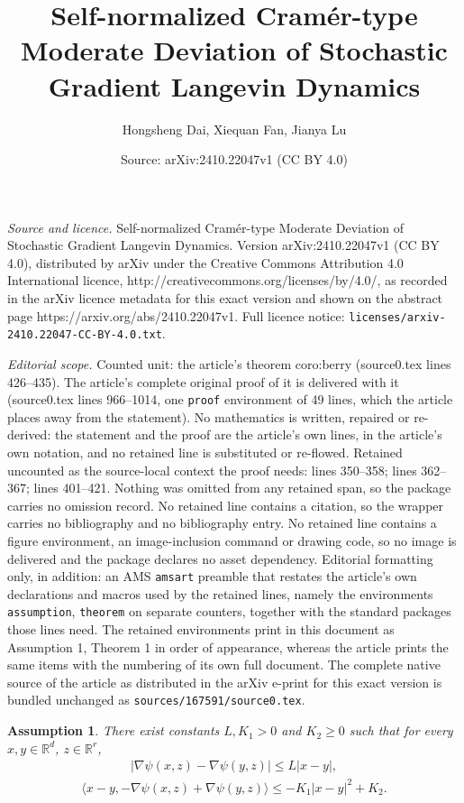 \documentclass[10pt,a4paper]{amsart}
\title{Self-normalized Cram\'er-type Moderate Deviation of Stochastic Gradient Langevin Dynamics}
\author{Hongsheng Dai, Xiequan Fan, Jianya Lu}
\date{Source: arXiv:2410.22047v1 (CC BY 4.0)}
\newtheorem{assumption}{Assumption}
\newcommand{\Ll}{\langle}
\newcommand{\R}{\mathbb{R}}\newcommand{\RR}{\mathbb{R}}
\newcommand{\Rr}{\rangle}
\begin{document}
\maketitle

\noindent\emph{Source and licence.} Self-normalized Cram\'er-type Moderate Deviation of Stochastic Gradient Langevin Dynamics. Version arXiv:2410.22047v1 (CC BY 4.0), distributed by arXiv under the Creative Commons Attribution 4.0 International licence, http://creativecommons.org/licenses/by/4.0/, as recorded in the arXiv licence metadata for this exact version and shown on the abstract page https://arxiv.org/abs/2410.22047v1. Full licence notice: \texttt{licenses/arxiv-2410.22047-CC-BY-4.0.txt}.\par\smallskip

\noindent\textit{Editorial scope.} Counted unit: the article's theorem coro:berry (source0.tex lines 426--435). The article's complete original proof of it is delivered with it (source0.tex lines 966--1014, one \texttt{proof} environment of 49 lines, which the article places away from the statement). No mathematics is written, repaired or re-derived: the statement and the proof are the article's own lines, in the article's own notation, and no retained line is substituted or re-flowed.  Retained uncounted as the source-local context the proof needs: lines 350--358; lines 362--367; lines 401--421.  Nothing was omitted from any retained span, so the package carries no omission record.  No retained line contains a citation, so the wrapper carries no bibliography and no bibliography entry.  No retained line contains a figure environment, an image-inclusion command or drawing code, so no image is delivered and the package declares no asset dependency.  Editorial formatting only, in addition: an AMS \texttt{amsart} preamble that restates the article's own declarations and macros used by the retained lines, namely the environments \texttt{assumption}, \texttt{theorem} on separate counters, together with the standard packages those lines need.  The retained environments print in this document as Assumption 1, Theorem 1 in order of appearance, whereas the article prints the same items with the numbering of its own full document.  The complete native source of the article as distributed in the arXiv e-print for this exact version is bundled unchanged as \texttt{sources/167591/source0.tex}.
\begin{assumption}\label{assu1}
	There exist constants $L, K_1 >0$ and $K_2 \ge 0$ such that for every $x,y\in \R^d$, $z\in\R^r$, 
	\begin{eqnarray}\label{e:lip}
		|\nabla\psi(x,z)-\nabla\psi(y,z)|\le L|x-y|,
	\end{eqnarray}
	\begin{eqnarray}\label{e:dissi}
		\Ll x-y,-\nabla \psi(x,z)+\nabla \psi(y,z)\Rr\le -K_1|x-y|^2+K_2.
	\end{eqnarray}
\end{assumption}
\end{document}
